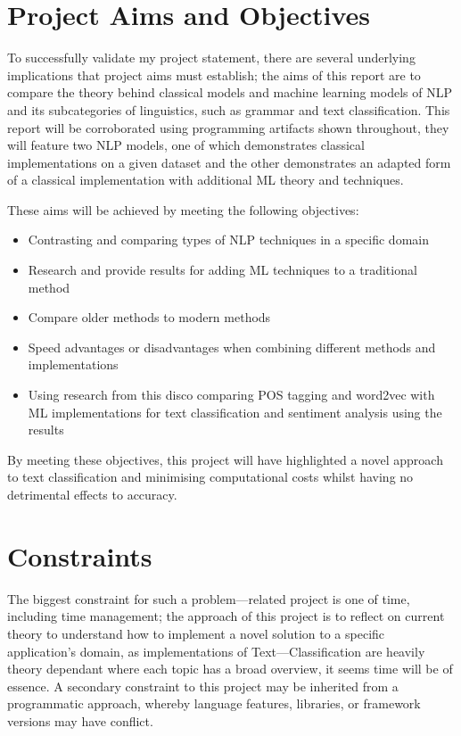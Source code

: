 \section{Project Aims and Objectives}

To successfully validate my project statement, there are several underlying implications that project aims must establish; the aims of this report are to compare the theory behind classical models and machine learning models of NLP and its subcategories of linguistics, such as grammar and text classification. This report will be corroborated using programming artifacts shown throughout, they will feature two NLP models, one of which demonstrates classical implementations on a given dataset and the other demonstrates an adapted form of a classical implementation with additional ML theory and techniques.

These aims will be achieved by meeting the following objectives:

\begin{itemize}
    \item Contrasting and comparing types of NLP techniques in a specific domain
    \item Research and provide results for adding ML techniques to a traditional method
	\item Compare older methods to modern methods
	\item Speed advantages or disadvantages when combining different methods and implementations
	\item Using research from this disco comparing POS tagging and word2vec with ML implementations for text classification and sentiment analysis using the results
\end{itemize}

By meeting these objectives, this project will have highlighted a novel approach to text classification and minimising computational costs whilst having no detrimental effects to accuracy.

\section{Constraints}

The biggest constraint for such a problem---related project is one of time, including time management; the approach of this project is to reflect on current theory to understand how to implement a novel solution to a specific application’s domain, as implementations of Text---Classification are heavily theory dependant where each topic has a broad overview, it seems time will be of essence. A secondary constraint to this project may be inherited from a programmatic approach, whereby language features, libraries, or framework versions may have conflict.

